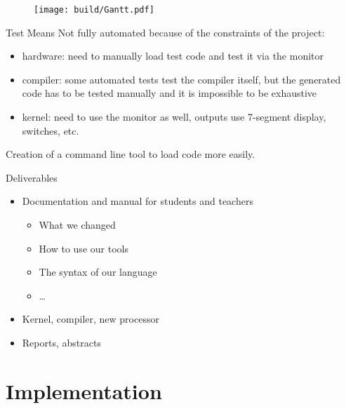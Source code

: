 \documentclass{beamer}
\begin{document}
      \begin{frame}[plain]
        \begin{figure}
          \texttt{[image: build/Gantt.pdf]}
        \end{figure}
      \end{frame}

      \begin{frame}{Test Means}
        Not fully automated because of the constraints of the project:
        \begin{itemize}
          \item hardware: need to manually load test code and test it via the
            monitor
          \item compiler: some automated tests test the compiler itself, but the
            generated code has to be tested manually and it is impossible to be
            exhaustive
          \item kernel: need to use the monitor as well, outputs use 7-segment
            display, switches, etc.
        \end{itemize}

        Creation of a command line tool to load code more easily.
      \end{frame}

      \begin{frame}{Deliverables}
        \begin{itemize}
          \item Documentation and manual for students and teachers
            \begin{itemize}
              \item What we changed
              \item How to use our tools
              \item The syntax of our language
              \item \dots
            \end{itemize}
          \item Kernel, compiler, new processor
          \item Reports, abstracts
        \end{itemize}
      \end{frame}

  \section{Implementation}
\end{document}
